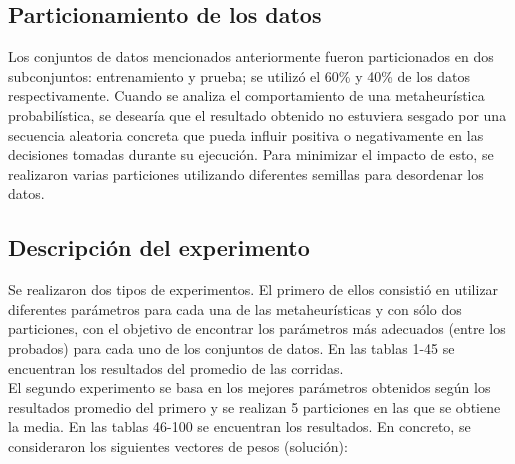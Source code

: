 \documentclass{ci5652}
\begin{document}

\subsection{Particionamiento de los datos}

Los conjuntos de datos mencionados anteriormente fueron particionados en dos
subconjuntos: entrenamiento y prueba; se utilizó el 60\% y 40\% de los datos
respectivamente. Cuando se analiza el comportamiento de una metaheurística
probabilística, se desearía que el resultado obtenido no estuviera sesgado por
una secuencia aleatoria concreta que pueda influir positiva o negativamente en
las decisiones tomadas durante su ejecución. Para minimizar el impacto de esto,
se realizaron varias particiones utilizando diferentes semillas para desordenar
los datos.


\subsection{Descripción del experimento}

Se realizaron dos tipos de experimentos. El primero de ellos consistió en
utilizar diferentes parámetros para cada una de las metaheurísticas  y con sólo
dos particiones, con el objetivo de encontrar los parámetros más adecuados
(entre los probados) para cada uno de los conjuntos de datos. En las tablas 1-45
se encuentran los resultados del promedio de las corridas.\\

El segundo experimento se basa en los mejores parámetros obtenidos según los
resultados promedio del primero y se realizan 5 particiones en las que se
obtiene la media. En las tablas 46-100 se encuentran los resultados. En
concreto, se consideraron los siguientes vectores de pesos (solución):
\end{document}
